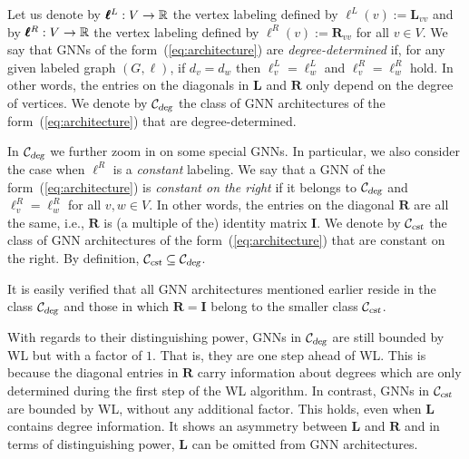Let us denote by $\pmb{\ell}^L:V\to \mathbb{R}$ the vertex labeling defined by $\pmb{\ell}^L(v):=\mathbf{L}_{vv}$ and by $\pmb{\ell}^R:V\to \mathbb{R}$ the vertex labeling defined by 
$\pmb{\ell}^R(v):=\mathbf{R}_{vv}$ for all $v\in V$. We say that GNNs of the form~(\ref{eq:architecture}) are \textit{degree-determined} if, for any given  labeled graph $(G,\pmb{\ell})$, if $d_v=d_w$ then $\pmb{\ell}^L_v=\pmb{\ell}^L_w$ and $\pmb{\ell}^R_v=\pmb{\ell}^R_w$ hold. In other words,
the entries on the diagonals in $\mathbf{L}$ and $\mathbf{R}$ only depend on the degree of vertices.
We denote by ${\cal C}_{\textsl{deg}}$ the class of GNN architectures of the form~(\ref{eq:architecture}) that are degree-determined.

In ${\cal C}_{\textsl{deg}}$ we further zoom in on some special GNNs.
In particular, we also consider the case when  $\pmb{\ell}^R$ is a 
\textit{constant} labeling. We say that a  GNN of the form~(\ref{eq:architecture}) is \textit{constant on the right} if
it belongs to ${\cal C}_{\textsl{deg}}$ and
$\pmb{\ell}^R_v=\pmb{\ell}^R_w$ for all $v,w\in V$. In other words, the entries on the diagonal $\mathbf{R}$ are all the same, i.e., $\mathbf{R}$ is (a multiple of the) identity matrix $\mathbf{I}$.
We denote by ${\cal C}_{\textsl{cst}}$ the class of GNN architectures of the form~(\ref{eq:architecture}) that are constant on the right. By definition,
${\cal C}_{\textsl{cst}}\subseteq {\cal C}_{\textsl{deg}}$.

It is easily verified that all GNN architectures
mentioned earlier reside in the class ${\cal C}_{\textsl{deg}}$ and those
in which $\mathbf{R}=\mathbf{I}$  belong to 
the smaller class ${\cal C}_{\textsl{cst}}$.


With regards to their distinguishing power, GNNs in ${\cal C}_{\textsl{deg}}$
are still bounded by WL but with a factor of $1$. That is, they are one step ahead of WL. This is because  the diagonal entries in $\mathbf{R}$ carry information about degrees which are only determined during the first step of the WL algorithm. In contrast, GNNs in ${\cal C}_{\textsl{cst}}$ are bounded by WL, without any additional factor. This holds, even when $\mathbf{L}$ contains degree information. It shows an asymmetry between $\mathbf{L}$ and $\mathbf{R}$
and in terms of distinguishing power, $\mathbf{L}$ can be omitted from GNN architectures. 

